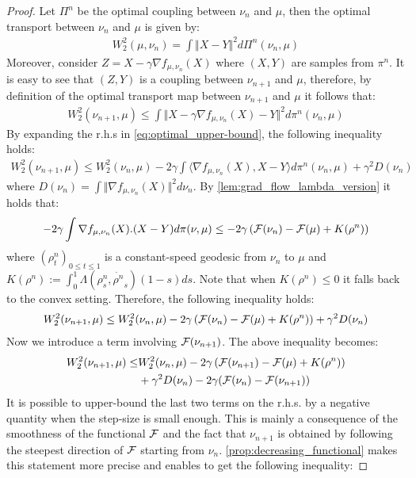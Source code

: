 \begin{proof}
	Let $\Pi^n$ be the optimal coupling between $\nu_n$ and $\mu$, then the optimal transport between $\nu_n$ and $\mu$ is given by:
	\begin{align}
	W_2^2(\mu,\nu_n)=\int \Vert X-Y \Vert^2 d\Pi^n(\nu_n,\mu)
	\end{align}
	Moreover, consider $Z=X-\gamma \nabla f_{\mu, \nu_n}(X)$ where $(X,Y)$ are samples from $\pi^n$. It is easy to see that $(Z,Y)$ is a coupling between $\nu_{n+1}$ and $\mu$, therefore, by definition of the optimal transport map between $\nu_{n+1}$ and $\mu$ it follows that:
	\begin{align}\label{eq:optimal_upper-bound}
	W_2^2(\nu_{n+1},\mu)\leq \int \Vert X-\gamma \nabla f_{\mu, \nu_n}(X)-Y\Vert^2 d\pi^n(\nu_n,\mu)
	\end{align}
	By expanding the r.h.s in \cref{eq:optimal_upper-bound}, the following inequality holds:
	\begin{align}\label{eq:main_inequality}
	W_2^2(\nu_{n+1},\mu)\leq W_2^2(\nu_{n},\mu) -2\gamma \int \langle \nabla f_{\mu, \nu_n}(X), X-Y \rangle d\pi^n(\nu_n,\mu)+ \gamma^2D(\nu_n)
	\end{align}
	where $D(\nu_n) = \int \Vert \nabla f_{\mu, \nu_n}(X)\Vert^2 d\nu_n $.
	By \cref{lem:grad_flow_lambda_version} it holds that:
	\begin{align}\label{eq:flow_upper-bound}
	-2\gamma \int  \nabla f_{\mu, \nu_n}(X).(X-Y) d\pi(\nu,\mu)
	\leq
	-2\gamma\left({{\mathcal F}}(\nu_n)- {{\mathcal F}}(\mu) +K(\rho^n)\right)
	\end{align}
	where $(\rho^n_t)_{0\leq t \leq 1}$ is a constant-speed geodesic from $\nu_n$ to $\mu$ and $K(\rho^n):=\int_0^1 \Lambda(\rho^n_s,\dot{\rho^n}_s)(1-s)ds$. %
	Note that when $K(\rho^n)\leq 0$ it falls back to the convex setting.
	Therefore, the following inequality holds:
	\begin{align}
	W_2^2(\nu_{n+1},\mu)\leq W_2^2(\nu_{n},\mu) - 2\gamma\left({{\mathcal F}}(\nu_n)- {{\mathcal F}}(\mu) +K(\rho^n)\right) +\gamma^2 D(\nu_n)
	\end{align}
	Now we introduce a term involving ${{\mathcal F}}(\nu_{n+1})$. The above inequality becomes:
	\begin{align}
	W_2^2(\nu_{n+1},\mu)\leq & W_2^2(\nu_{n},\mu) - 2\gamma\left({{\mathcal F}}(\nu_{n+1})- {{\mathcal F}}(\mu) +K(\rho^n)\right) \\
	&+\gamma^2 D(\nu_n) -2\gamma ({{\mathcal F}}(\nu_n)-{{\mathcal F}}(\nu_{n+1}))
	\label{eq:main_ineq_2}
	\end{align}
	It is possible to upper-bound the last two terms on the r.h.s. by a negative quantity when the step-size is small enough. This is mainly a consequence of the smoothness of the functional ${{\mathcal F}}$ and the fact that $\nu_{n+1}$ is obtained by following the steepest direction of ${{\mathcal F}}$ starting from $\nu_n$. \cref{prop:decreasing_functional} makes this statement more precise and enables to get the following inequality:

\end{proof}
